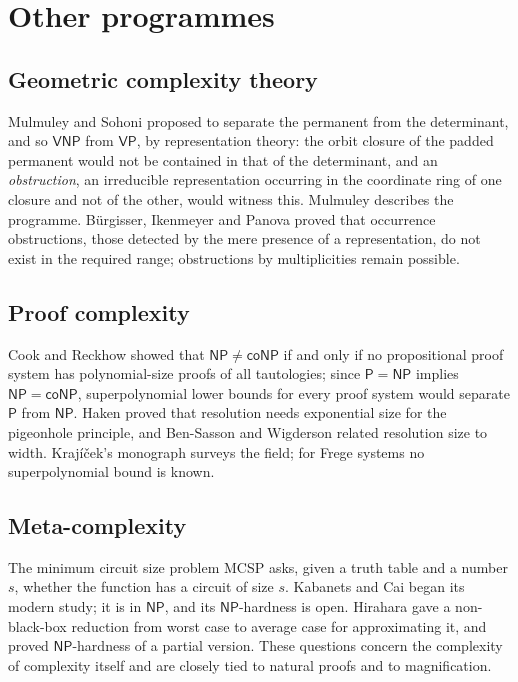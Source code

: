 \documentclass[11pt,reqno]{amsart}
\numberwithin{equation}{section}
\theoremstyle{plain}
\theoremstyle{definition}
\theoremstyle{remark}
\newcommand{\Pc}{\mathsf{P}}
\newcommand{\NP}{\mathsf{NP}}
\newcommand{\coNP}{\mathsf{coNP}}
\begin{document}
\section{Other programmes}\label{sec:otherroutes}

\subsection{Geometric complexity theory}
Mulmuley and Sohoni \cite{MS01} proposed to separate the permanent from the
determinant, and so $\mathsf{VNP}$ from $\mathsf{VP}$, by representation
theory: the orbit closure of the padded permanent would not be contained in
that of the determinant, and an \emph{obstruction}, an irreducible
representation occurring in the coordinate ring of one closure and not of the
other, would witness this. Mulmuley \cite{Mul12} describes the programme.
B\"urgisser, Ikenmeyer and Panova \cite{BIP19} proved that occurrence
obstructions, those detected by the mere presence of a representation, do not
exist in the required range; obstructions by multiplicities remain possible.

\subsection{Proof complexity}
Cook and Reckhow \cite{CR79} showed that $\NP\ne\coNP$ if and only if no
propositional proof system has polynomial-size proofs of all tautologies; since
$\Pc=\NP$ implies $\NP=\coNP$, superpolynomial lower bounds for every proof
system would separate $\Pc$ from $\NP$. Haken \cite{Hak85} proved that
resolution needs exponential size for the pigeonhole principle, and
Ben-Sasson and Wigderson \cite{BSW01} related resolution size to width.
Kraj\'i\v{c}ek's monograph \cite{Kra19} surveys the field; for Frege systems
no superpolynomial bound is known.

\subsection{Meta-complexity}
The minimum circuit size problem MCSP asks, given a truth table and a number
$s$, whether the function has a circuit of size $s$. Kabanets and Cai
\cite{KC00} began its modern study; it is in $\NP$, and its $\NP$-hardness is open.
Hirahara \cite{Hir18} gave a non-black-box reduction from worst case to average
case for approximating it, and \cite{Hir22} proved $\NP$-hardness of a partial
version. These questions concern the complexity of complexity itself and are
closely tied to natural proofs and to magnification.
\end{document}

